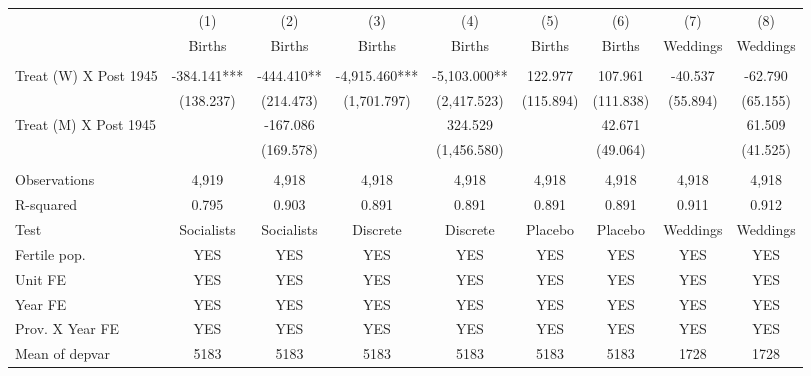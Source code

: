 \begin{tabular}{lcccccccc} \hline
 & (1) & (2) & (3) & (4) & (5) & (6) & (7) & (8) \\
 & Births & Births & Births & Births & Births & Births & Weddings & Weddings \\ \hline
 &  &  &  &  &  &  &  &  \\
Treat (W) X Post 1945 & -384.141*** & -444.410** & -4,915.460*** & -5,103.000** & 122.977 & 107.961 & -40.537 & -62.790 \\
 & (138.237) & (214.473) & (1,701.797) & (2,417.523) & (115.894) & (111.838) & (55.894) & (65.155) \\
Treat (M) X Post 1945 &  & -167.086 &  & 324.529 &  & 42.671 &  & 61.509 \\
 &  & (169.578) &  & (1,456.580) &  & (49.064) &  & (41.525) \\
 &  &  &  &  &  &  &  &  \\
Observations & 4,919 & 4,918 & 4,918 & 4,918 & 4,918 & 4,918 & 4,918 & 4,918 \\
R-squared & 0.795 & 0.903 & 0.891 & 0.891 & 0.891 & 0.891 & 0.911 & 0.912 \\
Test & Socialists & Socialists & Discrete & Discrete & Placebo & Placebo & Weddings & Weddings \\
Fertile pop. & YES & YES & YES & YES & YES & YES & YES & YES \\
Unit FE & YES & YES & YES & YES & YES & YES & YES & YES \\
Year FE & YES & YES & YES & YES & YES & YES & YES & YES \\
Prov. X Year FE & YES & YES & YES & YES & YES & YES & YES & YES \\
 Mean of depvar & 5183 & 5183 & 5183 & 5183 & 5183 & 5183 & 1728 & 1728 \\ \hline
\end{tabular}

